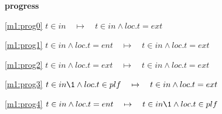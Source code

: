 \textbf{progress}
\begin{block}
\item[ \eqref{m1:prog0} ]$t \in in  \quad \mapsto\quad t \in in \land loc.t = ext $ %
\item[ \eqref{m1:prog1} ]$t \in in \land loc.t = ent  \quad \mapsto\quad t \in in \land loc.t = ext $ %
\item[ \eqref{m1:prog2} ]$t \in in \land loc.t = ext  \quad \mapsto\quad t \in in \land loc.t = ext $ %
\item[ \eqref{m1:prog3} ]$t \in in  %
		\1\land loc.t \in plf  \quad \mapsto\quad t \in in \land loc.t = ext $ %
\item[ \eqref{m1:prog4} ]$t \in in \land loc.t = ent  \quad \mapsto\quad t \in in  %
		\1\land loc.t \in plf $ %
\end{block}

